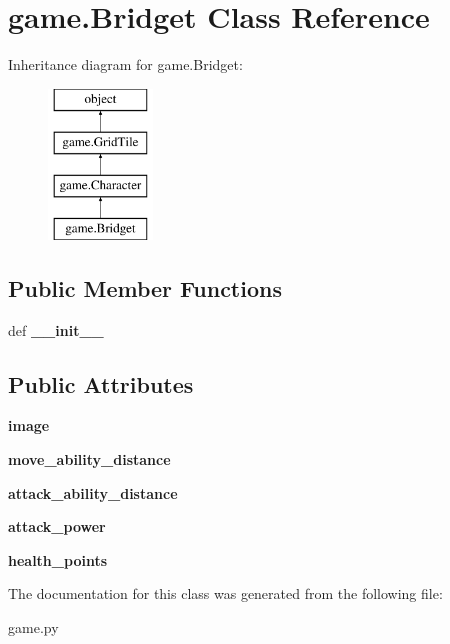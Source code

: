 \hypertarget{classgame_1_1Bridget}{\section{game.\-Bridget Class Reference}
\label{classgame_1_1Bridget}
}
Inheritance diagram for game.\-Bridget\-:\begin{figure}[H]
\begin{center}
\leavevmode
\includegraphics[height=4.000000cm]{classgame_1_1Bridget}
\end{center}
\end{figure}
\subsection*{Public Member Functions}
\begin{DoxyCompactItemize}
\item 
\hypertarget{classgame_1_1Bridget_ad4e6f9321bbaa2517223e7aedbf02506}{def {\bfseries \-\_\-\-\_\-init\-\_\-\-\_\-}}\label{classgame_1_1Bridget_ad4e6f9321bbaa2517223e7aedbf02506}

\end{DoxyCompactItemize}
\subsection*{Public Attributes}
\begin{DoxyCompactItemize}
\item 
\hypertarget{classgame_1_1Bridget_a31e484fbe78d55a092c758e90a089c06}{{\bfseries image}}\label{classgame_1_1Bridget_a31e484fbe78d55a092c758e90a089c06}

\item 
\hypertarget{classgame_1_1Bridget_a3db5aaacaad5161eccb76cc1f3d92f54}{{\bfseries move\-\_\-ability\-\_\-distance}}\label{classgame_1_1Bridget_a3db5aaacaad5161eccb76cc1f3d92f54}

\item 
\hypertarget{classgame_1_1Bridget_ae613de7294689a2ce89576205b6073e1}{{\bfseries attack\-\_\-ability\-\_\-distance}}\label{classgame_1_1Bridget_ae613de7294689a2ce89576205b6073e1}

\item 
\hypertarget{classgame_1_1Bridget_a2669cd98f86ef77b01e9f065ee1fce14}{{\bfseries attack\-\_\-power}}\label{classgame_1_1Bridget_a2669cd98f86ef77b01e9f065ee1fce14}

\item 
\hypertarget{classgame_1_1Bridget_adf25d85b6d474fa62352afaa85a60bf5}{{\bfseries health\-\_\-points}}\label{classgame_1_1Bridget_adf25d85b6d474fa62352afaa85a60bf5}

\end{DoxyCompactItemize}


The documentation for this class was generated from the following file\-:\begin{DoxyCompactItemize}
\item 
game.\-py\end{DoxyCompactItemize}
